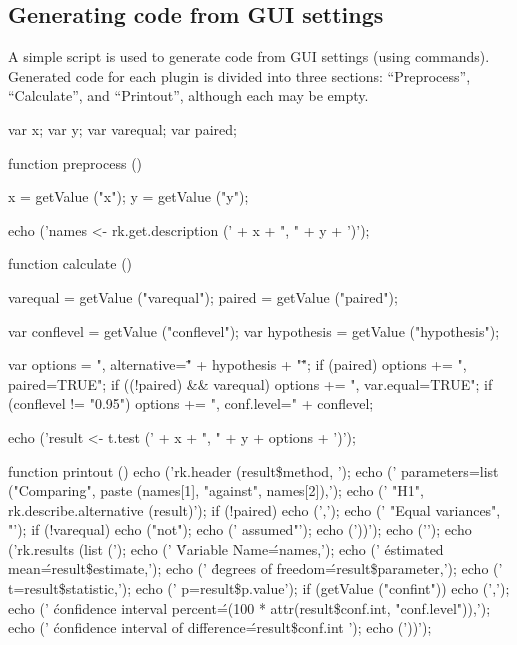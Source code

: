 \documentclass[article,shortnames]{jss}
\begin{document}
\subsection[Generating R code from GUI settings]{Generating  code from GUI settings}
\label{sec:generating_r_code_from_ui_settings}
A simple  script is used to generate  code from GUI settings (using  commands). Generated code for each plugin is divided into three sections: ``Preprocess'', ``Calculate'', and ``Printout'', although each
may be empty.

\begin{footnotesize}
\begin{Code}
var x;
var y;
var varequal;
var paired;

function preprocess () {
  x = getValue ("x");
  y = getValue ("y");

  echo ('names <- rk.get.description (' + x + ", " + y + ')\n');
}

function calculate () {
  varequal = getValue ("varequal");
  paired = getValue ("paired");

  var conflevel = getValue ("conflevel");
  var hypothesis = getValue ("hypothesis");

  var options = ", alternative=\"" + hypothesis + "\"";
  if (paired) options += ", paired=TRUE";
  if ((!paired) && varequal) options += ", var.equal=TRUE";
  if (conflevel != "0.95") options += ", conf.level=" + conflevel;

  echo ('result <- t.test (' + x + ", " + y + options + ')\n');
}

function printout () {
  echo ('rk.header (result\$method, \n');
  echo ('  parameters=list ("Comparing", paste (names[1], "against", names[2]),\n');
  echo ('  "H1", rk.describe.alternative (result)');
  if (!paired) {
    echo (',\n');
    echo ('  "Equal variances", "');
    if (!varequal) echo ("not");
    echo (' assumed"');
  }
  echo ('))\n');
  echo ('\n');
  echo ('rk.results (list (\n');
  echo ('  \'Variable Name\'=names,\n');
  echo ('  \'estimated mean\'=result\$estimate,\n');
  echo ('  \'degrees of freedom\'=result\$parameter,\n');
  echo ('  t=result\$statistic,\n');
  echo ('  p=result\$p.value');
  if (getValue ("confint")) {
    echo (',\n');
    echo ('  \'confidence interval percent\'=(100 * attr(result\$conf.int, "conf.level")),\n');
    echo ('  \'confidence interval of difference\'=result\$conf.int ');
  }
  echo ('))\n');
}
\end{Code}
\end{footnotesize}
\end{document}
